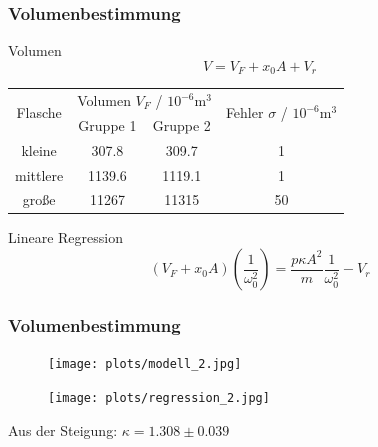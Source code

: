 \documentclass{beamer}
\begin{document}
\begin{frame}
\frametitle{Volumenbestimmung}

\begin{block}{Volumen}
$$V = V_F + x_0A + V_r$$
\end{block}

\begin{table}
\begin{tabular}{|c|c|c|c|}
\hline
\multirow{2}{*}{Flasche} & \multicolumn{2}{c|}{Volumen $V_F$ / $10^{-6}\mathrm m^3$} & \multirow{2}{*}{Fehler $\sigma$ / $10^{-6}\mathrm m^3$} \\
\cline{2-3}
& Gruppe 1 & Gruppe 2 & \\
\hline
 kleine & 307.8 & 309.7 & 1\\
\hline
mittlere & 1139.6 & 1119.1 & 1\\
\hline
große & 11267 & 11315 & 50\\
\hline
\end{tabular}
\end{table}

\begin{block}{Lineare Regression}
$$(V_F+x_0A)\left( \frac 1{\omega_0^2} \right) = \frac{p\kappa A^2}m \frac 1{\omega_0^2} - V_r$$
\end{block}

\end{frame}


\begin{frame}
\frametitle{Volumenbestimmung}

\begin{figure}
\begin{minipage}[t]{0.49\linewidth}
\centering
\texttt{[image: plots/modell\_2.jpg]}
\end{minipage}
\hfill
\begin{minipage}[t]{0.49\linewidth}
\centering
\texttt{[image: plots/regression\_2.jpg]}
\end{minipage}
\end{figure}
Aus der Steigung: \hspace{0.2cm} $\kappa = 1.308 \pm 0.039$

\end{frame}
\end{document}
